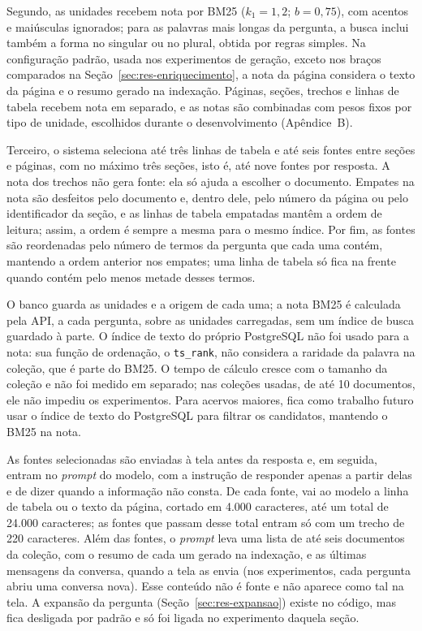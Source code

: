 \documentclass[12pt]{article}
\begin{document}
Segundo, as unidades recebem nota por BM25 ($k_1 = 1{,}2$; $b = 0{,}75$), com acentos e maiúsculas ignorados; para as palavras mais longas da pergunta, a busca inclui também a forma no singular ou no plural, obtida por regras simples. Na configuração padrão, usada nos experimentos de geração, exceto nos braços comparados na Seção~\ref{sec:res-enriquecimento}, a nota da página considera o texto da página e o resumo gerado na indexação. Páginas, seções, trechos e linhas de tabela recebem nota em separado, e as notas são combinadas com pesos fixos por tipo de unidade, escolhidos durante o desenvolvimento (Apêndice~B).

Terceiro, o sistema seleciona até três linhas de tabela e até seis fontes entre seções e páginas, com no máximo três seções, isto é, até nove fontes por resposta. A nota dos trechos não gera fonte: ela só ajuda a escolher o documento. Empates na nota são desfeitos pelo documento e, dentro dele, pelo número da página ou pelo identificador da seção, e as linhas de tabela empatadas mantêm a ordem de leitura; assim, a ordem é sempre a mesma para o mesmo índice. Por fim, as fontes são reordenadas pelo número de termos da pergunta que cada uma contém, mantendo a ordem anterior nos empates; uma linha de tabela só fica na frente quando contém pelo menos metade desses termos.

O banco guarda as unidades e a origem de cada uma; a nota BM25 é calculada pela API, a cada pergunta, sobre as unidades carregadas, sem um índice de busca guardado à parte. O índice de texto do próprio PostgreSQL não foi usado para a nota: sua função de ordenação, o \texttt{ts\_rank}, não considera a raridade da palavra na coleção, que é parte do BM25. O tempo de cálculo cresce com o tamanho da coleção e não foi medido em separado; nas coleções usadas, de até 10 documentos, ele não impediu os experimentos. Para acervos maiores, fica como trabalho futuro usar o índice de texto do PostgreSQL para filtrar os candidatos, mantendo o BM25 na nota.

As fontes selecionadas são enviadas à tela antes da resposta e, em seguida, entram no \emph{prompt} do modelo, com a instrução de responder apenas a partir delas e de dizer quando a informação não consta. De cada fonte, vai ao modelo a linha de tabela ou o texto da página, cortado em 4.000 caracteres, até um total de 24.000 caracteres; as fontes que passam desse total entram só com um trecho de 220 caracteres. Além das fontes, o \emph{prompt} leva uma lista de até seis documentos da coleção, com o resumo de cada um gerado na indexação, e as últimas mensagens da conversa, quando a tela as envia (nos experimentos, cada pergunta abriu uma conversa nova). Esse conteúdo não é fonte e não aparece como tal na tela. A expansão da pergunta (Seção~\ref{sec:res-expansao}) existe no código, mas fica desligada por padrão e só foi ligada no experimento daquela seção.
\end{document}
